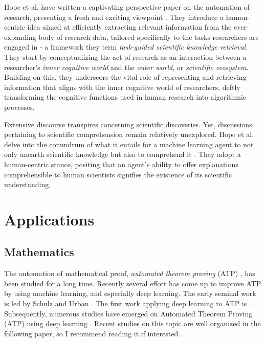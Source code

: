\documentclass{book}
\begin{document}
Hope et al. have written a captivating perspective paper on the automation of research, presenting a fresh and exciting viewpoint \cite{hope2022computational}. They introduce a human-centric idea aimed at efficiently extracting relevant information from the ever-expanding body of research data, tailored specifically to the tasks researchers are engaged in - a framework they term \textit{task-guided scientific knowledge retrieval}. They start by conceptualizing the act of research as an interaction between a researcher's \textit{inner cognitive world} and the \textit{outer world}, or \textit{scientific ecosystem}. Building on this, they underscore the vital role of representing and retrieving information that aligns with the inner cognitive world of researchers, deftly transforming the cognitive functions used in human research into algorithmic processes.

Extensive discourse transpires concerning scientific discoveries. Yet, discussions pertaining to scientific comprehension remain relatively unexplored. Hope et al. delve into the conundrum of what it entails for a machine learning agent to not only unearth scientific knowledge but also to comprehend it \cite{krenn2022scientific}. They adopt a human-centric stance, positing that an agent's ability to offer explanations comprehensible to human scientists signifies the existence of its scientific understanding.

\section{Applications}

\subsection{Mathematics}
The automation of mathematical proof, \textit{automated theorem proving} (ATP) , has been studied for a long time. Recently several effort has come up to improve ATP by using machine learning, and especially deep learning. The 
 early seminal work is led by Schulz \cite{schulz2001learning} and Urban \cite{urban2004mptp,urban2008malarea}. The first work applying deep learning to ATP is \cite{irving2016deepmath}. Subsequently, numerous studies have emerged on Automated Theorem Proving (ATP) using deep learning \cite{bansal2019holist}. Recent studies on this topic are well organized in the following paper, so I recommend reading it if interested \cite{rabe2021towards}.
\end{document}
